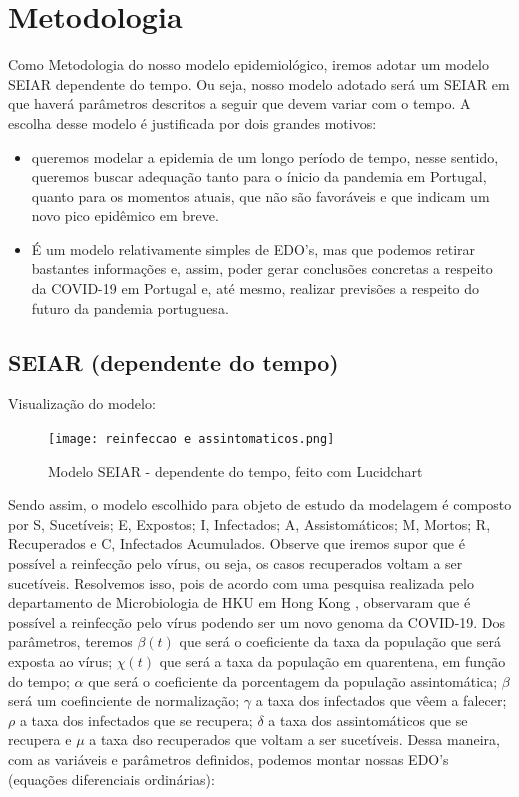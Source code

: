 \documentclass[12pt]{article}
\begin{document}
{\large \section{Metodologia} }
Como Metodologia do nosso modelo epidemiológico, iremos adotar um modelo SEIAR dependente do tempo. Ou seja, nosso modelo adotado será um SEIAR em que haverá parâmetros descritos a seguir que devem variar com o tempo.
\newline
A escolha desse modelo é justificada por dois grandes motivos:
\begin{itemize}
    \item queremos modelar a epidemia de um longo período de tempo, nesse sentido, queremos buscar adequação tanto para o ínicio da pandemia em Portugal, quanto para os momentos atuais, que não são favoráveis e que indicam um novo pico epidêmico em breve.
    \item É um modelo relativamente simples de EDO's, mas que podemos retirar bastantes informações e, assim, poder gerar conclusões concretas a respeito da COVID-19 em Portugal e, até mesmo, realizar previsões a respeito do futuro da pandemia portuguesa.
\end{itemize}
\subsection{SEIAR (dependente do tempo)}
Visualização do modelo: \newline
\begin{figure}[!h]
    \centering
    \texttt{[image: reinfeccao e assintomaticos.png]}
    \caption{Modelo SEIAR - dependente do tempo, feito com Lucidchart}
\end{figure}
\newline
Sendo assim, o modelo escolhido para objeto de estudo da modelagem é composto por S, Sucetíveis; E, Expostos; I, Infectados; A, Assistomáticos; M, Mortos; R, Recuperados e C, Infectados Acumulados. Observe que iremos supor que é possível a reinfecção pelo vírus, ou seja, os casos recuperados voltam a ser sucetíveis. Resolvemos isso, pois de acordo com uma pesquisa realizada pelo departamento de Microbiologia de HKU em Hong Kong \cite{reinfeccao}, observaram que é possível a reinfecção pelo vírus podendo ser um novo genoma da COVID-19.
\newline
\newline
Dos parâmetros, teremos $\beta(t)$ que será o coeficiente da taxa da população que será exposta ao vírus; $\chi(t)$ que será a taxa da população em quarentena, em função do tempo; $\alpha$ que será o coeficiente da porcentagem da população assintomática; $\beta$ será um coefinciente de normalização; $\gamma$ a taxa dos infectados que vêem a falecer; $\rho$ a taxa dos infectados que se recupera; $\delta$ a taxa dos assintomáticos que se recupera e $\mu$ a taxa dso recuperados que voltam a ser sucetíveis.
\newline
\newline
Dessa maneira, com as variáveis e parâmetros definidos, podemos montar nossas EDO's (equações diferenciais ordinárias):
\end{document}
